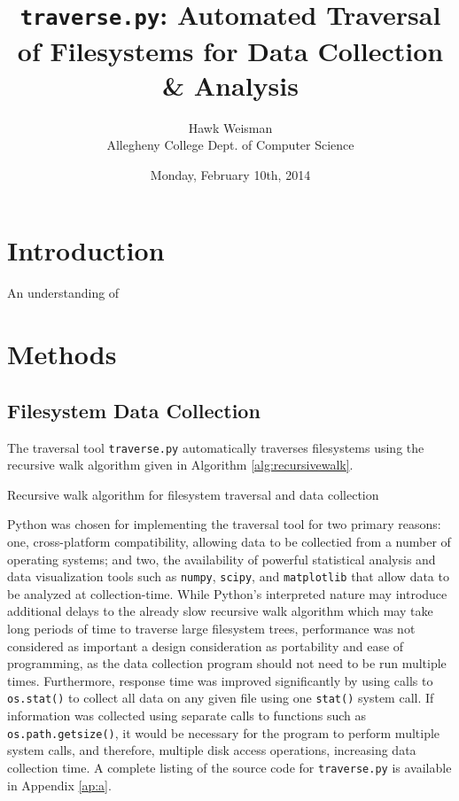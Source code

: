 \documentclass[12pt,a4paper]{article}
\author{Hawk Weisman\\Allegheny College Dept. of Computer Science}
\title{\texttt{traverse.py}: Automated Traversal of Filesystems for Data Collection \& Analysis}
\date{Monday, February 10th, 2014}
\begin{document}
	\maketitle
	\section{Introduction}

		An understanding of 

	\section{Methods}
		\subsection{Filesystem Data Collection}

			The traversal tool \texttt{traverse.py} automatically traverses filesystems using the recursive walk algorithm given in Algorithm \ref{alg:recursivewalk}.
		
			\begin{algorithm}[H]
			\label{alg:recursivewalk}
				\SetAlgoLined
				\DontPrintSemicolon

			  \caption{Recursive walk algorithm for filesystem traversal and data collection}
			\end{algorithm}

			Python was chosen for implementing the traversal tool for two primary reasons: one, cross-platform compatibility, allowing data to be collectied from a number of operating systems; and two, the availability of powerful statistical analysis and data visualization tools such as \texttt{numpy}, \texttt{scipy}, and \texttt{matplotlib} that allow data to be analyzed at collection-time. While Python's interpreted nature may introduce additional delays to the already slow recursive walk algorithm which may take long periods of time to traverse large filesystem trees, performance was not considered as important a design consideration as portability and ease of programming, as the data collection program should not need to be run multiple times. Furthermore, response time was improved significantly by using calls to \texttt{os.stat()} to collect all data on any given file using one \texttt{stat()} system call. If information was collected using separate calls to functions such as \texttt{os.path.getsize()}, it would be necessary for the program to perform multiple system calls, and therefore, multiple disk access operations, increasing data collection time. A complete listing of the source code for \texttt{traverse.py} is available in Appendix \ref{ap:a}.
\end{document}
